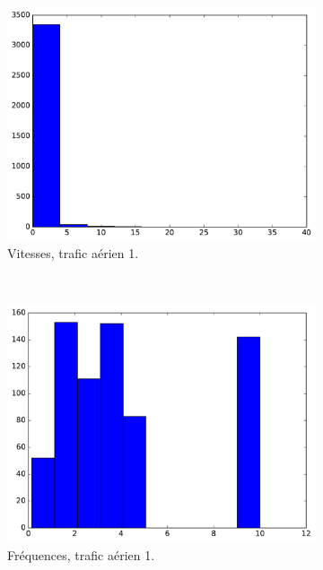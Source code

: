	\begin{figure}
		\begin{subfigure}[t]{\subImgWclicks}
			\centering
			\includegraphics[width=\textwidth]{figures/ch3/mhA_speed}
			\caption{Vitesses, trafic aérien 1.}
			\label{fig:mhA_speed}
		\end{subfigure}
		~
		\begin{subfigure}[t]{\subImgWclicks}
			\centering
			\includegraphics[width=\textwidth]{figures/ch3/mhA_frequency}
			\caption{Fréquences, trafic aérien 1.}
			\label{fig:mhA_frequency}
		\end{subfigure}
		~
		\begin{subfigure}[t]{\subImgWclicks}
			\centering

\end{subfigure}
\end{figure}

